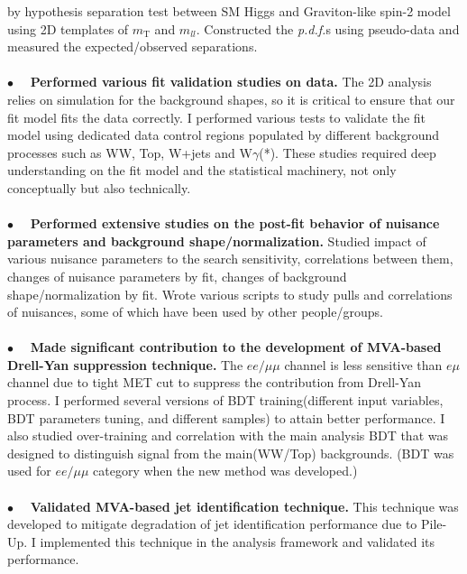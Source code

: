 \documentclass[margin]{res}
\begin{document}
\begin{resume}
      by hypothesis separation test between SM Higgs and Graviton-like spin-2 model using 
      2D templates of $m_{\mathrm{T}}$ and $m_{ll}$. 
      Constructed the \textit{p.d.f.}s  using pseudo-data 
      and measured the expected/observed separations. 
    \\  
    \\
    $\bullet\quad$  \textbf{Performed various fit validation studies on data.} The 2D analysis relies on 
      simulation for the background shapes, so it is critical to ensure that our fit 
      model fits the data correctly. I performed various tests to validate the fit
      model using dedicated data control regions populated by different background processes 
      such as WW, Top, W+jets and W$\gamma$(*). These studies required deep understanding
      on the fit model and the statistical machinery, not only conceptually but also
      technically.
    \\ 
    \\
    $\bullet\quad$  \textbf{Performed extensive studies on the post-fit behavior of nuisance parameters 
      and background shape/normalization.}
      Studied impact of various nuisance parameters to the search sensitivity,  
      correlations between them, changes of nuisance parameters by fit, 
      changes of background shape/normalization by fit.
      Wrote various scripts to study pulls and correlations of nuisances, 
      some of which have been used by other people/groups.  
    \\
    \\
    $\bullet\quad$  \textbf{Made significant contribution to the development of MVA-based Drell-Yan suppression technique.}
      The $ee/\mu\mu$ channel is less sensitive than $e\mu$ channel due to
      tight MET cut to suppress the contribution from Drell-Yan process. I performed 
      several versions of BDT training(different input variables, 
      BDT parameters tuning, and different samples) to attain better performance. 
      I also studied over-training and correlation with the main analysis BDT that was 
      designed to distinguish signal from the main(WW/Top) backgrounds.  
      (BDT was used for $ee/\mu\mu$ category when the new method was developed.)
    \\
    \\
    $\bullet\quad$  \textbf{Validated MVA-based jet identification technique.} This technique was developed 
      to mitigate degradation of jet identification performance due to Pile-Up. 
      I implemented this technique in the analysis framework and validated its performance.

\end{resume}
\end{document}
